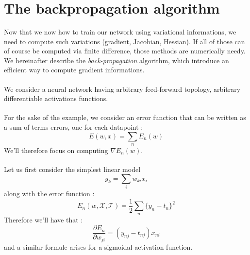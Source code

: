 \documentclass[a4paper]{article}
\begin{document}
	\section{The backpropagation algorithm}
	{
		\paragraph{} Now that we now how to train our network using variational informations, we need to compute such variations (gradient, Jacobian, Hessian). If all of those can of course be computed via finite difference, those methods are numerically needy. We hereinafter describe the \emph{back-propagation} algorithm, which introduce an efficient way to compute gradient informations. 
		
		\paragraph{} We consider a neural network having arbitrary feed-forward topology, arbitrary differentiable activations functions. 
		
		\paragraph{} For the sake of the example, we consider an error function that can be written as a sum of terms errors, one for each datapoint : 
		\begin{equation}
			E(w,x) = \sum_n E_n(w)
		\end{equation}
		We'll therefore focus on computing $\nabla E_n(w)$. 
		
		\paragraph{} Let us first consider the simplest linear model 
		\begin{equation}
			y_k = \sum_i w_{ki}x_i
		\end{equation}
		along with the error function : 
		\begin{equation}
			E_n(w,\mathcal{X},\mathcal{T}) = \frac{1}{2}\sum_n\{ y_n - t_n \}^2
		\end{equation}
		Therefore we'll have that : 
		\begin{equation}
			\frac{\partial E_n}{\partial w_{ji}} = (y_{nj} - t_{nj})x_{ni}
		\end{equation}
		and a similar formule arises for a sigmoidal activation function. 
		
}
\end{document}
